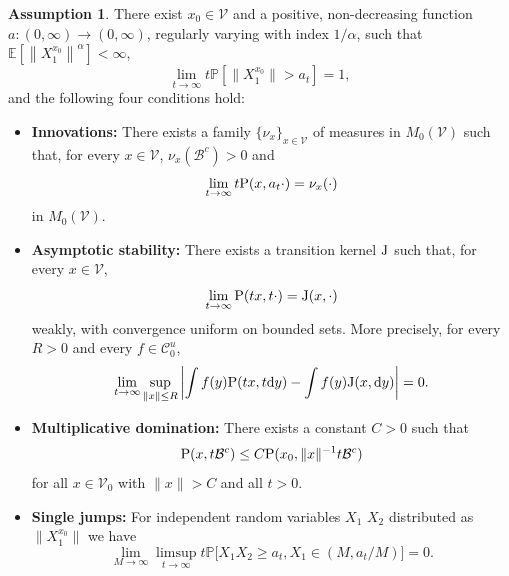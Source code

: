 \documentclass[preprint,12pt]{elsarticle}
\theoremstyle{definition}
\newtheorem{as}[thm]{Assumption}
\theoremstyle{remark}
\newcommand{\bfx}{{ x}}
\newcommand{\xbf}{{ x}}
\newcommand{\Xbf}{{ X}}
\newcommand{\bfy}{{ y}}
\newcommand{\1}{{\mathbf 1}}
\numberwithin{equation}{section}
\newcommand{\Pbb}{\mathbb{P}}
\newcommand{\ud}{{\rm d}}
\newcommand{\Prm}{{\rm P}}
\newcommand{\Krm}{{\rm J}}
\newcommand{\Vcal}{\mathcal{V}}
\newcommand{\Bcal}{\mathcal{B}}
\newcommand{\Ccal}{\mathcal{C}}
\begin{document}
  \begin{as}\label{as:2:first}
    There exist $\xbf_0 \in \Vcal$ and a positive, non-decreasing function 
    $a \colon (0,\infty) \to (0,\infty)$, 
    regularly varying with index $1/\alpha$, such that 
    $\mathbb{E}\left[ \left\|\Xbf_1^{\xbf_0}\right\|^\alpha \right]<\infty$,
    \begin{equation}\label{eq:2:banana}  
    	\lim_{t \to \infty} t \Pbb[\|\Xbf_1^{\xbf_0}\| > a_t] = 1,  
    \end{equation}  
    and the following four conditions hold:
    \begin{itemize}
      \item [$(i)$] \textbf{Innovations:} There exists a family 
    	  $\{\nu_\bfx\}_{\bfx \in \Vcal}$ of measures in $M_0(\Vcal)$ such that, 
    		for every $\bfx \in \Vcal$, $\nu_x(\Bcal^c)>0$ and
    		\begin{equation} \label{eq:4:gass1}  
    		  \lim_{t \to \infty} t \Prm(\bfx, a_t \cdot) = \nu_\bfx(\cdot)  
    		\end{equation}  
    		in $M_0(\Vcal)$.  

      \item [$(ii)$] \textbf{Asymptotic stability:} There exists a transition kernel
    		$\Krm$ such that, for every $\bfx \in \Vcal$,  
    		\begin{equation} \label{eq:4:gass2}  
    		  \lim_{t \to \infty} \Prm(t \bfx, t \cdot) = \Krm(\bfx,\cdot)  
    		\end{equation}  
    		weakly, with convergence uniform on bounded sets. 
    		More precisely, for every $R > 0$ and every $f \in \Ccal_0^u$,  
    		\begin{equation}\label{eq:3:conv}
    		  \lim_{t \to \infty} \sup_{\|\bfx\| \leq R}  
    			\left| \int f(\bfy) \Prm(t \bfx, t \ud \bfy) 
    			- \int f(\bfy) \Krm(\bfx,\ud \bfy) \right| = 0.  
    		\end{equation}  

      \item [$(iii)$] \textbf{Multiplicative domination:} There exists a constant $C>0$ such that
        \begin{equation*}
          \Prm(x, t\mathcal{B}^c) \leq C \Prm(x_0, \|x\|^{-1}t \mathcal{B}^c)
        \end{equation*}
        for all $x \in \mathcal{V}_0$ with
        $\|x\| >C$ and all $t>0$.

    		\item [$(iv)$] \textbf{Single jumps:} For independent random variables
          $X_1$ $X_2$ distributed as $\|X_1^{x_0}\|$ we have  
    			\begin{equation} \label{gass3}  
    			  \lim_{M \to \infty} \limsup_{t \to \infty} t  
    				\Pbb\big[X_1X_2 \geq a_t, X_1 \in (M, a_t/M)\big] = 0.  
    			\end{equation}  
	  \end{itemize}
  \end{as}
\end{document}

